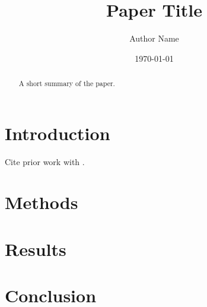 \documentclass[11pt]{article}
\title{Paper Title}
\author{Author Name}
\date{\today}
\begin{document}
\maketitle

\begin{abstract}
A short summary of the paper.
\end{abstract}

\section{Introduction}
Cite prior work with \citep{example2024}.

\section{Methods}

\section{Results}

\section{Conclusion}



\end{document}
